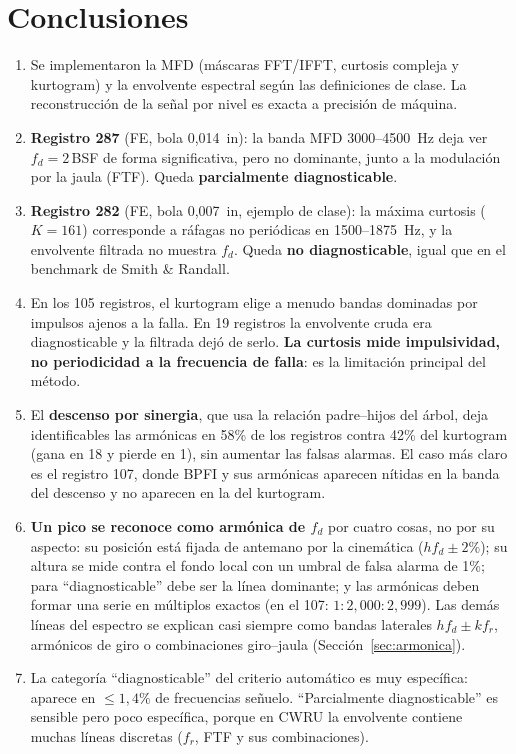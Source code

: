 \documentclass[11pt,a4paper]{article}
\begin{document}
\section{Conclusiones}
\begin{enumerate}[itemsep=2pt]
\item Se implementaron la MFD (máscaras FFT/IFFT, curtosis compleja y kurtogram) y la envolvente espectral según las definiciones de clase. La reconstrucción de la señal por nivel es exacta a precisión de máquina.
\item \textbf{Registro 287} (FE, bola 0{,}014~in): la banda MFD 3000--4500~Hz deja ver $f_d=2\,$BSF de forma significativa, pero no dominante, junto a la modulación por la jaula (FTF). Queda \textbf{parcialmente diagnosticable}.
\item \textbf{Registro 282} (FE, bola 0{,}007~in, ejemplo de clase): la máxima curtosis ($K=161$) corresponde a ráfagas no periódicas en 1500--1875~Hz, y la envolvente filtrada no muestra $f_d$. Queda \textbf{no diagnosticable}, igual que en el benchmark de Smith \& Randall.
\item En los 105 registros, el kurtogram elige a menudo bandas dominadas por impulsos ajenos a la falla. En 19 registros la envolvente cruda era diagnosticable y la filtrada dejó de serlo. \textbf{La curtosis mide impulsividad, no periodicidad a la frecuencia de falla}: es la limitación principal del método.
\item El \textbf{descenso por sinergia}, que usa la relación padre--hijos del árbol, deja identificables las armónicas en 58\% de los registros contra 42\% del kurtogram (gana en 18 y pierde en 1), sin aumentar las falsas alarmas. El caso más claro es el registro 107, donde BPFI y sus armónicas aparecen nítidas en la banda del descenso y no aparecen en la del kurtogram.
\item \textbf{Un pico se reconoce como armónica de $f_d$} por cuatro cosas, no por su aspecto: su posición está fijada de antemano por la cinemática ($hf_d\pm2\%$); su altura se mide contra el fondo local con un umbral de falsa alarma de 1\%; para ``diagnosticable'' debe ser la línea dominante; y las armónicas deben formar una serie en múltiplos exactos (en el 107: $1:2{,}000:2{,}999$). Las demás líneas del espectro se explican casi siempre como bandas laterales $hf_d\pm kf_r$, armónicos de giro o combinaciones giro--jaula (Sección~\ref{sec:armonica}).
\item La categoría ``diagnosticable'' del criterio automático es muy específica: aparece en $\le1{,}4\%$ de frecuencias señuelo. ``Parcialmente diagnosticable'' es sensible pero poco específica, porque en CWRU la envolvente contiene muchas líneas discretas ($f_r$, FTF y sus combinaciones).
\end{enumerate}
\end{document}
